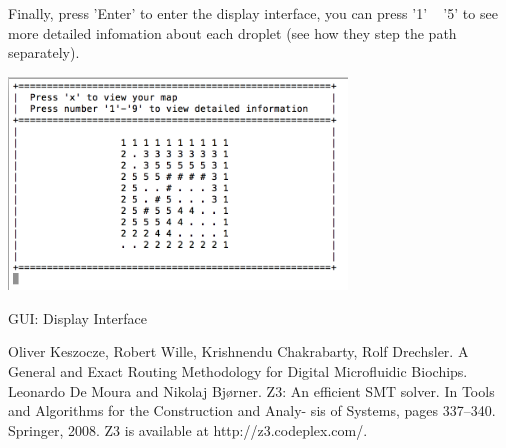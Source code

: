 \documentclass[twocolumn]{article}
\begin{document}
Finally, press 'Enter' to enter the display interface, you can press '1' ~ '5' to see more detailed infomation about each droplet (see how they step the path separately).

\begin{center}
\makeatletter
\def\@captype{figure}
\makeatother
\includegraphics [width = 9cm]{GUI-display}
\caption{GUI: Display Interface}
\label{gd}
\end{center}


\begin{thebibliography}{1}
Oliver Keszocze, Robert Wille, Krishnendu Chakrabarty, Rolf Drechsler. A General and Exact Routing Methodology for Digital Microfluidic Biochips.
Leonardo De Moura and Nikolaj Bjørner. Z3: An efficient SMT solver. In Tools and Algorithms for the Construction and Analy- sis of Systems, pages 337–340. Springer, 2008. Z3 is available at http://z3.codeplex.com/.
\end{thebibliography}
\end{document}
